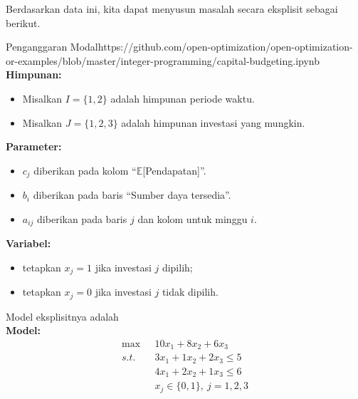 Berdasarkan data ini, kita dapat menyusun masalah secara eksplisit sebagai berikut.

\begin{examplewithallcode}{Penganggaran Modal}{}{https://github.com/open-optimization/open-optimization-or-examples/blob/master/integer-programming/capital-budgeting.ipynb}{}
\noindent \textbf{Himpunan:}
\begin{itemize}
\item Misalkan $I = \{1,2\}$ adalah himpunan periode waktu.
\item Misalkan $J = \{1, 2,3\}$ adalah himpunan investasi yang mungkin.
\end{itemize}

\noindent \textbf{Parameter:}
\begin{itemize}
\item $c_j$ diberikan pada kolom ``$\mathbb{E}$[Pendapatan]''.
\item $b_i$ diberikan pada baris ``Sumber daya tersedia''.
\item $a_{ij}$ diberikan pada baris $j$ dan kolom untuk minggu $i$.
\end{itemize}

\noindent \textbf{Variabel:}
\begin{itemize}
\item tetapkan $x_j = 1$ jika investasi $j$ dipilih;
\item tetapkan $x_j = 0$ jika investasi $j$ tidak dipilih.
\end{itemize}

Model eksplisitnya adalah\\
\noindent \textbf{Model:}
\begin{align*}
	\max\ \ \  & 10x_1+8x_2+6x_3 \tag{Total Pendapatan yang Diharapkan}\\
	s.t. \ \ &
	3x_1+1x_2+2x_3\leq5 \tag{Kendala sumber daya minggu 1}\\
	&4x_1+2x_2+1x_3\leq6 \tag{Kendala sumber daya minggu 2}\\
&x_j \in \{0,1\},\  j = 1,2,3
\end{align*}

\end{examplewithallcode}
